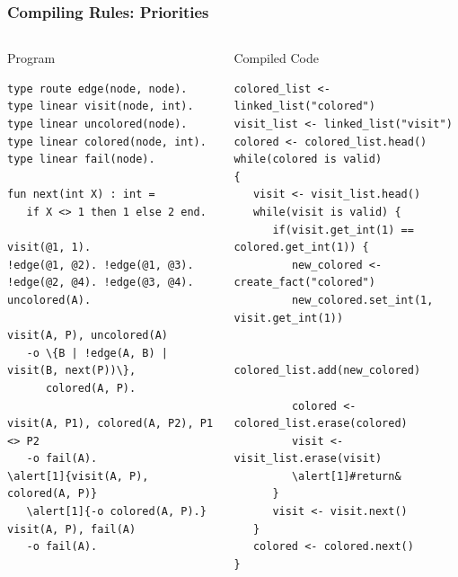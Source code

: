 \documentclass{beamer}
\let\oldalert\alert
\renewcommand{\alert}[2][]{%
  \if\relax\detokenize{#1}\relax%
    \oldalert{#2}%
  \else
    \oldalert<#1>{#2}%
  \fi}
\begin{document}
\begin{frame}[fragile]
   \frametitle{Compiling Rules: Priorities}
   \begin{columns}[t]
     \begin{block}{Program}
       \begin{Verbatim}[fontsize=\tiny,commandchars=\\\{\},frame=single]
type route edge(node, node).
type linear visit(node, int).
type linear uncolored(node).
type linear colored(node, int).
type linear fail(node).

fun next(int X) : int =
   if X <> 1 then 1 else 2 end.

visit(@1, 1).
!edge(@1, @2). !edge(@1, @3).
!edge(@2, @4). !edge(@3, @4).
uncolored(A).

visit(A, P), uncolored(A)
   -o \{B | !edge(A, B) | visit(B, next(P))\},
      colored(A, P).

visit(A, P1), colored(A, P2), P1 <> P2
   -o fail(A).
\alert[1]{visit(A, P), colored(A, P)}
   \alert[1]{-o colored(A, P).}
visit(A, P), fail(A)
   -o fail(A).
\end{Verbatim}
     \end{block}
   \begin{block}{Compiled Code}
\begin{Verbatim}[fontsize=\tiny,commandchars=\\\#\&,frame=single]
colored_list <- linked_list("colored")
visit_list <- linked_list("visit")
colored <- colored_list.head()
while(colored is valid)
{
   visit <- visit_list.head()
   while(visit is valid) {
      if(visit.get_int(1) == colored.get_int(1)) {
         new_colored <- create_fact("colored")
         new_colored.set_int(1, visit.get_int(1))

         colored_list.add(new_colored)

         colored <- colored_list.erase(colored)
         visit <- visit_list.erase(visit)
         \alert[1]#return&
      }
      visit <- visit.next()
   }
   colored <- colored.next()
}
\end{Verbatim}
   \end{block}
   \end{columns}
\end{frame}
\end{document}
